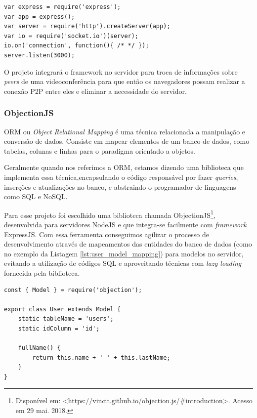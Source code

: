 \begin{lstlisting}[caption={Servidor ExpressJS integrado com SocketIO}, label={lst:socketio_server}]
var express = require('express');
var app = express();
var server = require('http').createServer(app);
var io = require('socket.io')(server);
io.on('connection', function(){ /* */ });
server.listen(3000);
\end{lstlisting}

O projeto integrará o framework no servidor para troca de informações sobre \textit{peers} de uma videoconferência para que então os navegadores possam realizar a conexão P2P entre eles e eliminar a necessidade do servidor.

\subsubsection{ObjectionJS}

ORM ou \textit{Object Relational Mapping} é uma técnica relacionada a manipulação e conversão de dados. Consiste em mapear elementos de um banco de dados, como tabelas, colunas e linhas para o paradigma orientado a objetos. 

Geralmente quando nos referimos a ORM, estamos dizendo uma biblioteca que implementa essa técnica,encapsulando o código responsável por fazer \textit{queries}, inserções e atualizações no banco, e abstraindo o programador de linguagens como SQL e NoSQL.

Para esse projeto foi escolhido uma biblioteca chamada ObjectionJS\footnote{Disponível em: <https://vincit.github.io/objection.js/\#introduction>. Acesso em 29 mai. 2018.}, desenvolvida para servidores NodeJS e que integra-se facilmente com \textit{framework} ExpressJS. Com essa ferramenta conseguimos agilizar o processo de desenvolvimento através de mapeamentos das entidades do banco de dados (como no exemplo da Listagem \ref{lst:user_model_mapping}) para modelos no servidor, evitando a utilização de códigos  SQL e aproveitando técnicas com \textit{lazy loading} fornecida pela biblioteca.

\begin{lstlisting}[caption={Mapeamento modelo User}, label={lst:user_model_mapping}]
const { Model } = require('objection');
	
export class User extends Model {
	static tableName = 'users';
	static idColumn = 'id';
	  
	fullName() {
		return this.name + ' ' + this.lastName;
    }
}
\end{lstlisting}

